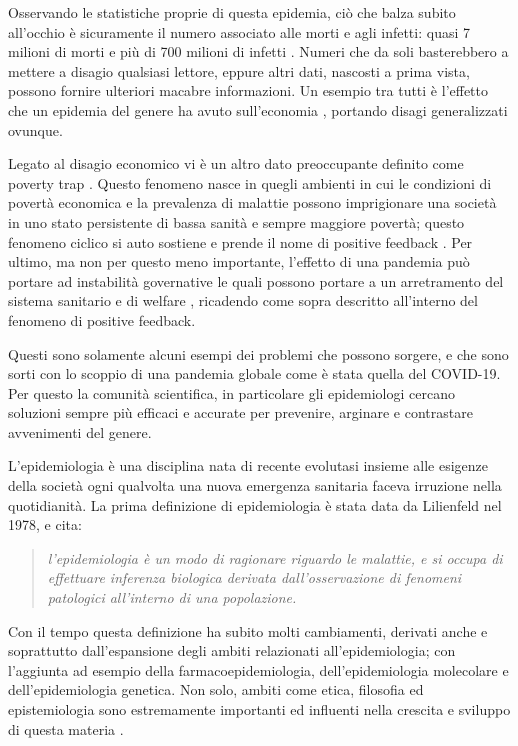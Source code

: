 Osservando le statistiche proprie di questa epidemia, 
ciò che balza subito all’occhio è sicuramente il numero 
associato alle morti e agli infetti: quasi 7 milioni di 
morti e più di 700 milioni di infetti \cite{world_health_organization}. 
Numeri che da soli basterebbero a mettere a disagio 
qualsiasi lettore, eppure altri dati, nascosti a prima 
vista, possono fornire ulteriori macabre informazioni. 
Un esempio tra tutti è l’effetto che un epidemia del 
genere ha avuto sull’economia \cite{world_bank_group_2023}, 
portando disagi generalizzati ovunque. 

Legato al disagio economico vi è un altro dato preoccupante 
definito come poverty trap \cite{Bonds2009-sg} \cite{wiki:Cycle_of_poverty}. 
Questo fenomeno nasce in quegli ambienti in cui le 
condizioni di povertà economica e la prevalenza di malattie 
possono imprigionare una società in uno stato persistente 
di bassa sanità e sempre maggiore povertà; 
questo fenomeno ciclico si auto sostiene e prende il nome 
di positive feedback \cite{wiki:Positive_feedback}. 
Per ultimo, ma non per questo meno importante, l’effetto di 
una pandemia può portare ad instabilità governative le 
quali possono portare a un arretramento del sistema 
sanitario e di welfare \cite{https://doi.org/10.1002/epa2.1152}, 
ricadendo come sopra descritto all’interno del fenomeno di positive feedback.

Questi sono solamente alcuni esempi dei problemi che 
possono sorgere, e che sono sorti con lo scoppio di una 
pandemia globale come è stata quella del COVID-19. 
Per questo la comunità scientifica, in particolare gli 
epidemiologi cercano soluzioni sempre più efficaci e 
accurate per prevenire, arginare e contrastare avvenimenti 
del genere.

L’epidemiologia è una disciplina nata di recente 
evolutasi insieme alle esigenze della società ogni 
qualvolta una nuova emergenza sanitaria faceva irruzione 
nella quotidianità. La prima definizione di epidemiologia 
è stata data da Lilienfeld \cite{10.1371/journal.pone.0208442} 
nel 1978, e cita: 

\begin{quotation}
    \emph{l’epidemiologia è un modo di ragionare riguardo le 
    malattie, e si occupa di effettuare inferenza biologica 
    derivata dall’osservazione di fenomeni patologici 
    all’interno di una popolazione.}
\end{quotation}

Con il tempo questa definizione ha subito molti cambiamenti, 
derivati anche e soprattutto dall’espansione degli ambiti 
relazionati all’epidemiologia; con l’aggiunta ad esempio 
della farmacoepidemiologia, dell’epidemiologia molecolare 
e dell’epidemiologia genetica. Non solo, ambiti come etica, 
filosofia ed epistemiologia sono estremamente importanti 
ed influenti nella crescita e sviluppo di questa materia \cite{10.1371/journal.pone.0208442}. 

